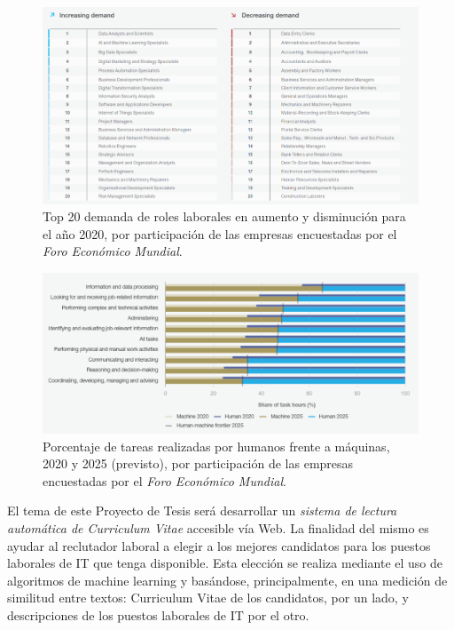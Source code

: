\documentclass[12pt,a4paper]{article}
\begin{document}
\begin{sloppypar}
\begin{figure}[H]    %
  \centering
  \includegraphics[width=1\textwidth]{images/Increasing_Jobs.png} 	%
  \caption{Top 20 demanda de roles laborales en aumento y disminución para el año 2020, por participación de las empresas encuestadas por el \textit{Foro Económico Mundial}\cite{jobs_future}.}  
  \label{fig:Increasing_Jobs}
\end{figure}

\begin{figure}[H]    %
  \centering
  \includegraphics[width=1\textwidth]{images/Automatizacion.png} 	%
  \caption{Porcentaje de tareas realizadas por humanos frente a máquinas, 2020 y 2025 (previsto),
por participación de las empresas encuestadas por el \textit{Foro Económico Mundial}\cite{jobs_future}.}  
  \label{fig:Automatizacion}
\end{figure}

El tema de este Proyecto de Tesis será desarrollar un \textit{sistema de lectura automática de Curriculum Vitae} accesible vía Web. La finalidad del mismo es ayudar al reclutador laboral a elegir a los mejores candidatos para los puestos laborales de IT que tenga disponible. Esta elección se realiza mediante el uso de algoritmos de machine learning y basándose, principalmente, en una medición de similitud entre textos: Curriculum Vitae de los candidatos, por un lado, y descripciones de los puestos laborales de IT por el otro.


\end{sloppypar}
\end{document}

